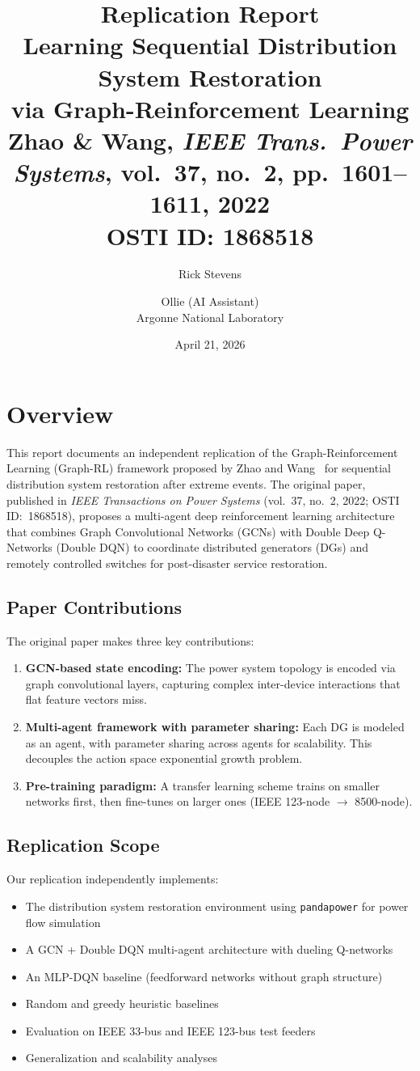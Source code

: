 \documentclass[11pt]{article}
\title{\textbf{Replication Report}\\[0.3em]
\large Learning Sequential Distribution System Restoration\\
via Graph-Reinforcement Learning\\[0.3em]
\normalsize Zhao \& Wang, \textit{IEEE Trans.\ Power Systems}, vol.~37, no.~2, pp.~1601--1611, 2022\\
\normalsize OSTI ID: 1868518}
\author{Rick Stevens \and Ollie (AI Assistant)\\
Argonne National Laboratory}
\date{April 21, 2026}
\begin{document}
\maketitle
\thispagestyle{fancy}

\section{Overview}

This report documents an independent replication of the Graph-Reinforcement Learning (Graph-RL) framework proposed by Zhao and Wang~\cite{zhao2021} for sequential distribution system restoration after extreme events. The original paper, published in \textit{IEEE Transactions on Power Systems} (vol.~37, no.~2, 2022; OSTI ID:~1868518), proposes a multi-agent deep reinforcement learning architecture that combines Graph Convolutional Networks (GCNs) with Double Deep Q-Networks (Double DQN) to coordinate distributed generators (DGs) and remotely controlled switches for post-disaster service restoration.

\subsection{Paper Contributions}
The original paper makes three key contributions:
\begin{enumerate}[leftmargin=*]
    \item \textbf{GCN-based state encoding:} The power system topology is encoded via graph convolutional layers, capturing complex inter-device interactions that flat feature vectors miss.
    \item \textbf{Multi-agent framework with parameter sharing:} Each DG is modeled as an agent, with parameter sharing across agents for scalability. This decouples the action space exponential growth problem.
    \item \textbf{Pre-training paradigm:} A transfer learning scheme trains on smaller networks first, then fine-tunes on larger ones (IEEE 123-node $\to$ 8500-node).
\end{enumerate}

\subsection{Replication Scope}
Our replication independently implements:
\begin{itemize}[leftmargin=*]
    \item The distribution system restoration environment using \texttt{pandapower} for power flow simulation
    \item A GCN + Double DQN multi-agent architecture with dueling Q-networks
    \item An MLP-DQN baseline (feedforward networks without graph structure)
    \item Random and greedy heuristic baselines
    \item Evaluation on IEEE 33-bus and IEEE 123-bus test feeders
    \item Generalization and scalability analyses
\end{itemize}
\end{document}

